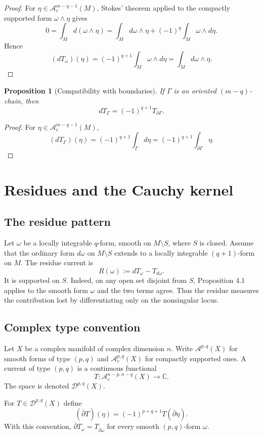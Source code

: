 \documentclass[11pt,a4paper]{article}
\newtheorem{proposition}[theorem]{Proposition}
\theoremstyle{definition}
\theoremstyle{remark}
\newcommand{\C}{\mathbb C}
\newcommand{\A}{\mathcal A}
\newcommand{\Dcur}{\mathcal D}
\newcommand{\ddbar}{\bar\partial}
\begin{document}
\begin{proof}
For $\eta\in\A_c^{m-q-1}(M)$, Stokes' theorem applied to the compactly supported form $\omega\wedge\eta$ gives
\[
0=\int_M d(\omega\wedge\eta)
 =\int_M d\omega\wedge\eta+(-1)^q\int_M\omega\wedge d\eta.
\]
Hence
\[
(dT_\omega)(\eta)=(-1)^{q+1}\int_M\omega\wedge d\eta
=\int_Md\omega\wedge\eta.
\]
\end{proof}

\begin{proposition}[Compatibility with boundaries]
If $\Gamma$ is an oriented $(m-q)$-chain, then
\[
dT_\Gamma=(-1)^{q+1}T_{\partial\Gamma}.
\]
\end{proposition}

\begin{proof}
For $\eta\in\A_c^{m-q-1}(M)$,
\[
(dT_\Gamma)(\eta)=(-1)^{q+1}\int_\Gamma d\eta
=(-1)^{q+1}\int_{\partial\Gamma}\eta.
\]
\end{proof}

\section{Residues and the Cauchy kernel}

\subsection{The residue pattern}

Let $\omega$ be a locally integrable $q$-form, smooth on $M\setminus S$, where $S$ is closed. Assume that the ordinary form $d\omega$ on $M\setminus S$ extends to a locally integrable $(q+1)$-form on $M$. The residue current is
\[
R(\omega):=dT_\omega-T_{d\omega}.
\]
It is supported on $S$. Indeed, on any open set disjoint from $S$, Proposition 4.1 applies to the smooth form $\omega$ and the two terms agree. Thus the residue measures the contribution lost by differentiating only on the nonsingular locus.

\subsection{Complex type convention}

Let $X$ be a complex manifold of complex dimension $n$. Write $\A^{p,q}(X)$ for smooth forms of type $(p,q)$ and $\A_c^{p,q}(X)$ for compactly supported ones. A current of type $(p,q)$ is a continuous functional
\[
T:\A_c^{n-p,n-q}(X)\longrightarrow\C.
\]
The space is denoted $\Dcur^{p,q}(X)$.

For $T\in\Dcur^{p,q}(X)$ define
\[
(\ddbar T)(\eta)=(-1)^{p+q+1}T(\ddbar\eta).
\]
With this convention, $\ddbar T_\omega=T_{\ddbar\omega}$ for every smooth $(p,q)$-form $\omega$.
\end{document}

